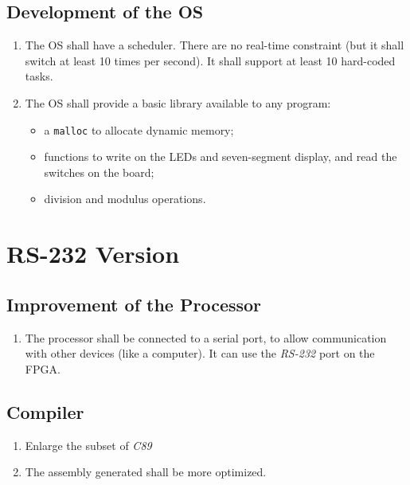\documentclass{article}
\begin{document}
      \subsection{Development of the OS}
        \begin{enumerate}
          \item The OS shall have a scheduler. There are no real-time constraint
            (but it shall switch at least 10 times per second). It shall support
            at least 10 hard-coded tasks.
          \item The OS shall provide a basic library available to any program:
            \begin{itemize}
              \item a \verb+malloc+ to allocate dynamic memory;
              \item functions to write on the LEDs and seven-segment display,
                and read the switches on the board;
              \item division and modulus operations.
             \end{itemize}
        \end{enumerate}

    \section{RS-232 Version}

      \subsection{Improvement of the Processor}
        \begin{enumerate}
          \item The processor shall be connected to a serial port, to allow
            communication with other devices (like a computer). It can use the
            \textit{RS-232} port on the FPGA.
        \end{enumerate}

      \subsection{Compiler}
        \begin{enumerate}
          \item Enlarge the subset of \textit{C89}
          \item The assembly generated shall be more optimized.
        \end{enumerate}
\end{document}
